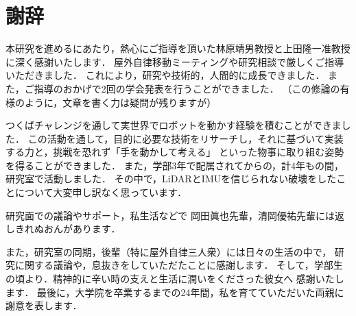 \chapter*{謝辞}

本研究を進めるにあたり，熱心にご指導を頂いた林原靖男教授と上田隆一准教授に深く感謝いたします．
屋外自律移動ミーティングや研究相談で厳しくご指導いただきました．
これにより，研究や技術的，人間的に成長できました．
また，ご指導のおかげで2回の学会発表を行うことができました．
（この修論の有様のように，文章を書く力は疑問が残りますが）

つくばチャレンジを通して実世界でロボットを動かす経験を積むことができました．
この活動を通して，目的に必要な技術をリサーチし，それに基づいて実装する力と，挑戦を恐れず「手を動かして考える」
といった物事に取り組む姿勢を得ることができました．
また，学部3年で配属されてからの，計4年もの間，研究室で活動しました．
その中で，LiDARとIMUを信じられない破壊をしたことについて大変申し訳なく思っています．

研究面での議論やサポート，私生活などで
岡田眞也先輩，清岡優祐先輩には返しきれぬおんがあります．

また，研究室の同期，後輩（特に屋外自律三人衆）には日々の生活の中で，
研究に関する議論や，息抜きをしていただたことに感謝します．
そして，学部生の頃より．精神的に辛い時の支えと生活に潤いをくださった彼女へ
感謝いたします．
最後に，大学院を卒業するまでの24年間，私を育てていただいた両親に謝意を表します．

